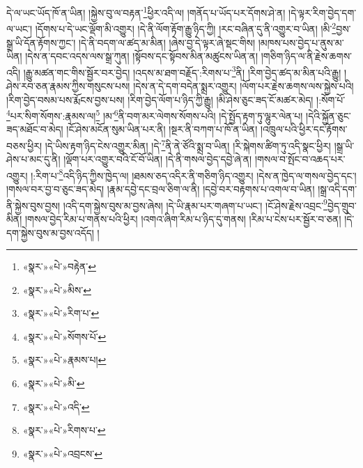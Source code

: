 དེ་ལ་ཡང་ཡོད་ཁོ་ན་ཡིན། །སྐྱེས་བུ་ལ་བརྟན་\footnote{«སྣར་»«པེ་»བརྟེན་}ཕྱིར་འདི་ལ། །གནོད་པ་ཡོད་པར་དོགས་ཤེ་ན། །དེ་ལྟར་རིག་བྱེད་དག་ལ་ཡང་། །དོགས་པ་དེ་ཡང་ལྡོག་མི་འགྱུར། །དེ་ནི་ལོག་རྟོག་རྒྱུ་ཉིད་ཀྱི། །རང་བཞིན་དུ་ནི་འགྱུར་བ་ཡིན། །མི་\footnote{«སྣར་»«པེ་»མིས་}བྱས་སྒྲ་ཡི་དོན་རྟོགས་ཀྱང་། །དེ་ནི་བདག་ལ་ཚད་མ་མིན། །ཞེས་བྱ་དེ་ལྟར་ཞེ་སྡང་གིས། །མཁས་པས་བྱེད་པ་ནུས་མ་ཡིན། །དེས་ན་དབང་འདས་ལས་སྒྲ་ཀུན། །སྟོབས་དང་སྟོབས་མིན་མཚུངས་ཡིན་ན། །གཅིག་ཉིད་ལ་ནི་རྗེས་ཆགས་འདི། །རྒྱུ་མཚན་གང་གིས་སྦྱོར་བར་བྱེད། །འདས་མ་ཐག་བརྗོད་:རིགས་པ་\footnote{«སྣར་»«པེ་»རིག་པ་}ནི། །རིག་བྱེད་ཚད་མ་མིན་པའི་རྒྱུ། །ཤེས་རབ་ཅན་རྣམས་ཀྱིས་གསུངས་པས། །དེས་ན་དེ་དག་བདེན་སྨྲར་འགྱུར། །ལོག་པར་རྗེས་ཆགས་ལས་སྐྱེས་པའི། །རིག་བྱེད་བསམ་པས་རྨོངས་བྱས་པས། །རིག་བྱེད་ལོག་པ་ཉིད་ཀྱི་རྒྱུ། །མི་ཤེས་ཅུང་ཟད་ངོ་མཚར་མེད། །:སོག་པོ་\footnote{«སྣར་»«པེ་»སོགས་པོ་}པར་སིག་སོགས་:རྣམས་ལ།\footnote{«སྣར་»«པེ་»རྣམས་པ།} །མ་\footnote{«སྣར་»«པེ་»མི་}ནི་བག་མར་ལེགས་སོགས་པའི། །དེ་སྤྱོད་རྟག་ཏུ་ལྷུར་ལེན་པ། །དེའི་སྐྱོན་ཅུང་ཟད་མཐོང་བ་མེད། །ངོ་ཤེས་མངོན་སུམ་ཡིན་པར་ནི། །སྔར་ནི་བཀག་པ་ཁོ་ན་ཡིན། །འཁྲུལ་པའི་ཕྱིར་དང་རྟོགས་བཅས་ཕྱིར། །དེ་ཡིས་རྟག་ཉིད་ངེས་འགྱུར་མིན། །དེ་\footnote{«སྣར་»«པེ་»འདི་}ནི་ནེ་ཙོའི་སྨྲ་བ་ཡིན། །རི་སྐེགས་ཚིག་ཏུ་འདི་སྣང་ཕྱིར། །སྒྲ་ཡི་ཤེས་པ་མང་དུ་ནི། །ལྡོག་པར་འགྱུར་བའི་ངོ་བོ་ཡིན། །དེ་ནི་གསལ་བྱེད་དབྱེ་ཞེ་ན། །གསལ་བ་སྤོང་བ་འཆད་པར་འགྱུར། །:རིག་པ་\footnote{«སྣར་»«པེ་»རིགས་པ་}འདི་ཉིད་ཀྱིས་ཁྱེད་ལ། །ཐམས་ཅད་འདིར་ནི་གཅིག་ཉིད་འགྱུར། །དེས་ན་ཁྱེད་ལ་གསལ་བྱེད་དང་། །གསལ་བར་བྱ་བ་ཅུང་ཟད་མེད། །རྣམ་དབྱེ་དང་བྲལ་ཅིག་ལ་ནི། །དབྱེ་བར་བརྟགས་པ་འགལ་བ་ཡིན། །སྒྲ་འདི་དག་ནི་སྐྱེས་བུས་བྱས། །འདི་དག་སྐྱེས་བུས་མ་བྱས་ཞེས། །དེ་ཡི་རྣམ་པར་གཞག་པ་ཡང་། །ངོ་ཤེས་རྗེས་འབྲང་\footnote{«སྣར་»«པེ་»འབྲངས་}བྱེད་གྲུབ་མིན། །གསལ་བྱེད་རིམ་པ་གནས་པའི་ཕྱིར། །འགའ་ཞིག་རིམ་པ་ཉིད་དུ་གནས། །རིམ་པ་ངེས་པར་སྦྱོར་བ་ཅན། །དེ་དག་སྐྱེས་བུས་མ་བྱས་འདོད། །
